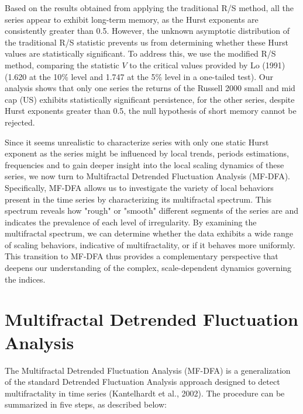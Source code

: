 \documentclass[11pt]{extarticle}
\begin{document}
\FloatBarrier


Based on the results obtained from applying the traditional R/S method, all the series appear to exhibit long-term memory,
as the Hurst exponents are consistently greater than 0.5. However, the unknown asymptotic distribution of the traditional R/S
statistic prevents us from determining whether these Hurst values are statistically significant. To address this, we use the modified
R/S method, comparing the statistic \( V \) to the critical values provided by Lo (1991) (1.620 at the 10\% level and 1.747 at the 5\%
level in a one-tailed test). Our analysis shows that only one series the returns of the Russell 2000 small and mid cap (US) exhibits
statistically significant persistence, for the other series, despite Hurst exponents greater than 0.5, the null hypothesis of short memory cannot be rejected.

Since it seems unrealistic to characterize series with only one static Hurst exponent as the series might be influenced by local trends,
periods estimations, frequencies and to gain deeper insight into
the local scaling dynamics of these series, we now turn to Multifractal Detrended Fluctuation Analysis (MF-DFA).
Specifically, MF-DFA allows us to investigate the variety of local behaviors present in the time series by characterizing its multifractal
spectrum. This spectrum reveals how "rough" or "smooth" different segments of the series are and indicates the prevalence of each level of
irregularity. By examining the multifractal spectrum, we can determine whether the data exhibits a wide range of scaling behaviors, indicative
of multifractality, or if it behaves more uniformly. This transition to MF-DFA thus provides a complementary perspective that deepens our understanding
of the complex, scale-dependent dynamics governing the indices.

\section{Multifractal Detrended Fluctuation Analysis}
\label{sec:mfdfa}

The Multifractal Detrended Fluctuation Analysis (MF-DFA) is a generalization of the standard Detrended Fluctuation
Analysis approach designed to detect multifractality in time series (Kantelhardt et al., 2002). The procedure can be summarized in five steps, as described below:
\end{document}
